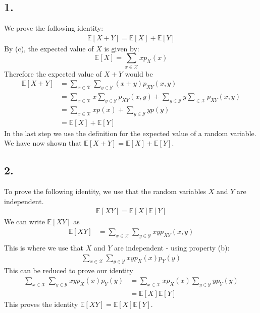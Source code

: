 \documentclass[a4paper]{article}
\begin{document}
\subsection*{1.}
We prove the following identity:
\begin{align*}
\mathbb{E}[X+Y]=\mathbb{E}[X]+\mathbb{E}[Y]
\end{align*}
By (c), the expected value of $X$ is given by:
$$\mathbb{E}[X]=\sum_{x\in \mathcal{X}}xp_X(x)$$
Therefore the expected value of $X+Y$ would be
\begin{align*}
\mathbb{E}[X+Y] &=\sum_{x\in \mathcal{X}}\sum_{y\in \mathcal{Y}} (x+y)p_{XY}(x,y) \\
                &= \sum_{x\in \mathcal{X}}x\sum_{y\in \mathcal{Y}} p_{XY}(x,y)+ \sum_{y\in \mathcal{Y}}y\sum_{\in \mathcal{X}} p_{XY}(x,y) \\
                &= \sum_{x\in \mathcal{X}}xp(x)+\sum_{y\in \mathcal{Y}}yp(y) \\ 
                &= \mathbb{E}[X]+\mathbb{E}[Y]
\end{align*}
In the last step we use the definition for the expected value of a random variable. We have now shown that $\mathbb{E}[X+Y]=\mathbb{E}[X]+\mathbb{E}[Y]$.
\subsection*{2.}
To prove the following identity, we use that the random variables $X$ and $Y$ are independent.
\begin{align*}
\mathbb{E}[XY]=\mathbb{E}[X]\mathbb{E}[Y]
\end{align*}
We can write $\mathbb{E}[XY]$ as
\begin{align*}
\mathbb{E}[XY]           &= \sum_{x\in \mathcal{X}}\sum_{y\in \mathcal{Y}} xy p_{XY}(x,y)\\
\end{align*}
This is where we use that $X$ and $Y$ are independent - using property (b):
\begin{align*}
\sum_{x\in \mathcal{X}}\sum_{y\in \mathcal{Y}} xyp_{X}(x)p_{Y}(y)
\end{align*}
This can be reduced to prove our identity
\begin{align*}
\sum_{x\in \mathcal{X}}\sum_{y\in \mathcal{Y}} xyp_{X}(x)p_{Y}(y) &= \sum_{x\in \mathcal{X}}xp_{X}(x)\sum_{y\in \mathcal{Y}} yp_{Y}(y) \\
&= \mathbb{E}[X]\mathbb{E}[Y]
\end{align*}
This proves the identity $\mathbb{E}[XY]=\mathbb{E}[X]\mathbb{E}[Y]$.
\end{document}
